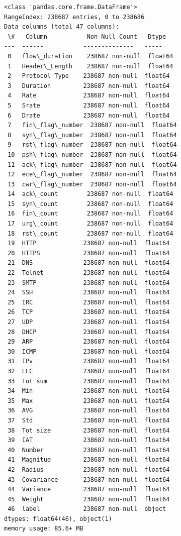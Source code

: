 \documentclass[11pt]{article}
\begin{document}
    \begin{Verbatim}[commandchars=\\\{\}]
<class 'pandas.core.frame.DataFrame'>
RangeIndex: 238687 entries, 0 to 238686
Data columns (total 47 columns):
 \#   Column           Non-Null Count   Dtype
---  ------           --------------   -----
 0   flow\_duration    238687 non-null  float64
 1   Header\_Length    238687 non-null  float64
 2   Protocol Type    238687 non-null  float64
 3   Duration         238687 non-null  float64
 4   Rate             238687 non-null  float64
 5   Srate            238687 non-null  float64
 6   Drate            238687 non-null  float64
 7   fin\_flag\_number  238687 non-null  float64
 8   syn\_flag\_number  238687 non-null  float64
 9   rst\_flag\_number  238687 non-null  float64
 10  psh\_flag\_number  238687 non-null  float64
 11  ack\_flag\_number  238687 non-null  float64
 12  ece\_flag\_number  238687 non-null  float64
 13  cwr\_flag\_number  238687 non-null  float64
 14  ack\_count        238687 non-null  float64
 15  syn\_count        238687 non-null  float64
 16  fin\_count        238687 non-null  float64
 17  urg\_count        238687 non-null  float64
 18  rst\_count        238687 non-null  float64
 19  HTTP             238687 non-null  float64
 20  HTTPS            238687 non-null  float64
 21  DNS              238687 non-null  float64
 22  Telnet           238687 non-null  float64
 23  SMTP             238687 non-null  float64
 24  SSH              238687 non-null  float64
 25  IRC              238687 non-null  float64
 26  TCP              238687 non-null  float64
 27  UDP              238687 non-null  float64
 28  DHCP             238687 non-null  float64
 29  ARP              238687 non-null  float64
 30  ICMP             238687 non-null  float64
 31  IPv              238687 non-null  float64
 32  LLC              238687 non-null  float64
 33  Tot sum          238687 non-null  float64
 34  Min              238687 non-null  float64
 35  Max              238687 non-null  float64
 36  AVG              238687 non-null  float64
 37  Std              238687 non-null  float64
 38  Tot size         238687 non-null  float64
 39  IAT              238687 non-null  float64
 40  Number           238687 non-null  float64
 41  Magnitue         238687 non-null  float64
 42  Radius           238687 non-null  float64
 43  Covariance       238687 non-null  float64
 44  Variance         238687 non-null  float64
 45  Weight           238687 non-null  float64
 46  label            238687 non-null  object
dtypes: float64(46), object(1)
memory usage: 85.6+ MB
    \end{Verbatim}
\end{document}
